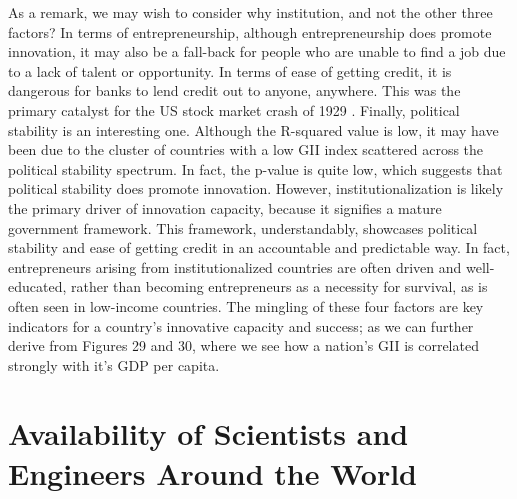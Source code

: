 \documentclass[15pt]{article}
\begin{document}
\noindent As a remark, we may wish to consider why institution, and not the other three factors? In terms of entrepreneurship, although entrepreneurship does promote innovation, it may also be a fall-back for people who are unable to find a job due to a lack of talent or opportunity. In terms of ease of getting credit, it is dangerous for banks to lend credit out to anyone, anywhere. This was the primary catalyst for the US stock market crash of 1929 \cite{20}. Finally, political stability is an interesting one. Although the R-squared value is low, it may have been due to the cluster of countries with a low GII index scattered across the political stability spectrum. In fact, the p-value is quite low, which suggests that political stability does promote innovation. However, institutionalization is likely the primary driver of innovation capacity, because it signifies a mature government framework. This framework, understandably, showcases political stability and ease of getting credit in an accountable and predictable way. In fact, entrepreneurs arising from institutionalized countries are often driven and well-educated, rather than becoming entrepreneurs as a necessity for survival, as is often seen in low-income countries. The mingling of these four factors are key indicators for a country's innovative capacity and success; as we can further derive from Figures 29 and 30, where we see how a nation's GII is correlated strongly with it's GDP per capita.

\newpage

\section{Availability of Scientists and Engineers Around the World}
\end{document}
